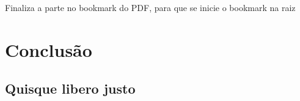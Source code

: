 \documentclass[12pt,openright,twoside,a4paper,english,french,spanish,brazil]{abntex2}
\begin{document}
 Finaliza a parte no bookmark do PDF, para que se inicie o bookmark na raiz
% 

\chapter*[Conclusão]{Conclusão}

\lipsum[31-33]

\postextual
\cite{@}


%
%


\begin{apendicesenv}

\partapendices

\chapter{Quisque libero justo}

\lipsum[50]

\lipsum[55-57]

\end{apendicesenv}


\end{document}
